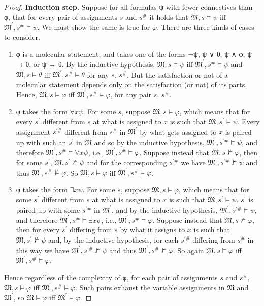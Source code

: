 \documentclass[12pt]{report}
\theoremstyle{nonumberplain}
\newtheorem{proof}{Proof}
\newcommand{\M}{\mathfrak{M}}
\begin{document}
\begin{proof}
\medskip\noindent \textbf{Induction step.} Suppose for all formulas ψ with fewer connectives than φ, that for every pair of assignments $s$ and $s^{\#}$ it holds that $\M, s ⊨ ψ$ iff $\M^{\prime}, s^{\#} ⊨ ψ$. We must show the same is true for $φ$. There are three kinds of cases to consider.
\begin{enumerate}
\item φ is a molecular statement, and takes one of the forms ¬ψ, ψ ∨ θ, ψ ∧ φ, ψ → θ, or ψ ↔ θ. By the inductive hypothesis, $\M, s ⊨ ψ$ iff $\M^{\prime}, s^{\#} ⊨ ψ$ and $\M, s ⊨ θ$ iff $\M^{\prime}, s^{\#} ⊨ θ$ for any $s$, $s^{\#}$. But the satisfaction or not of a molecular statement depends only on the satisfaction (or not) of its parts. Hence, $\M, s ⊨ φ$ iff $\M^{\prime}, s^{\#} ⊨ φ$, for any pair $s$, $s^{\#}$.
\item φ takes the form $∀xψ$. For some $s$, suppose $\M, s ⊨ φ$, which means that for every $s^{\prime}$ different from $s$ at what is assigned to $x$ is such that $\M, s^{\prime} ⊨ ψ$. Every assignment $s^{\prime\#}$ different from $s^{\#}$ in $\M^{\prime}$ by what gets assigned to $x$ is paired up with such an $s^\prime$ in $\M$ and so by the inductive hypothesis, $\M^{\prime}, s^{\prime\#} ⊨ ψ$, and therefore $\M^{\prime}, s^{\#} ⊨ ∀xψ$, i.e., $\M^{\prime}, s^{\#} ⊨ φ$. Suppose instead that $\M, s ⊭ φ$, then for some $s^\prime$, $\M, s^{\prime} ⊭ ψ$ and for the corresponding $s^{\prime\#}$ we have $\M^{\prime}, s^{\prime\#} ⊭ ψ$ and thus $\M^{\prime}, s^{\#} ⊭ φ$. So  $\M, s ⊨ φ$ iff $\M^{\prime}, s^{\#} ⊨ φ$.
\item φ takes the form $∃xψ$. For some $s$, suppose $\M, s ⊨ φ$, which means that for some $s^{\prime}$ different from $s$ at what is assigned to $x$ is such that $\M, s^{\prime} ⊨ ψ$. $s^\prime$ is paired up with some $s^{\prime\#}$ in $\M^{\prime}$, and by the inductive hypothesis, $\M^{\prime}, s^{\prime\#} ⊨ ψ$, and therefore $\M^{\prime}, s^{\#} ⊨ ∃xψ$, i.e., $\M^{\prime}, s^{\#} ⊨ φ$. Suppose instead that $\M, s ⊭ φ$, then for every $s^\prime$ differing from $s$ by what it assigns to $x$ is such that $\M, s^{\prime} ⊭ ψ$ and, by the inductive hypothesis, for each $s^{\prime\#}$ differing from $s^{\#}$ in this way we have $\M^{\prime}, s^{\prime\#} ⊭ ψ$ and thus $\M^{\prime}, s^{\#} ⊭ φ$. So again $\M, s ⊨ φ$ iff $\M^{\prime}, s^{\#} ⊨ φ$.

\end{enumerate}

\noindent Hence regardless of the complexity of φ, for each pair of assignments $s$ and $s^{\#}$, $\M, s ⊨ φ$ iff $\M^{\prime}, s^{\#} ⊨ φ$. Such pairs exhaust the variable assignments in $\M$ and $\M^\prime$, so $\M ⊨ φ$ iff $\M^{\prime} ⊨ φ$.
\end{proof}
\end{document}
